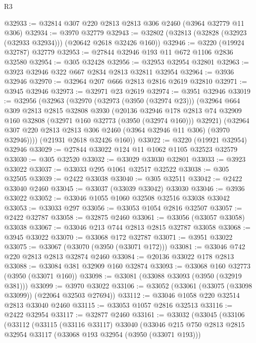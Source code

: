 \begin{lexlean}{R3}
\begin{coremodule}
@32933 := @32814 @307 @220 @2813 @2813 @306 @2460 (@3964 @32779 @11 @306)
@32934 := @3970 @32779
@32943 := @32802 (@32813 (@32828 (@32923 (@32933 @32934))) (@20642 @2618 @32426 @160))
@32946 := @3220 (@19924 @32787) @32779
@32953 := @27844 @32946 @193 @11 @672 @1106 @2836 @32580
@32954 := @305 @32428
@32956 := @32953 @32954 @32801
@32963 := @3923 @32946 @322 @667 @2834 @2813 @32811 @32954
@32964 := @3936 @32946
@32970 := @32964 @207 @666 @2813 @2816 @2619 @32810
@32971 := @3945 @32946
@32973 := @32971 @23 @2619
@32974 := @3951 @32946
@33019 := @32956
    (@32963
      (@32970
        (@32973 (@3950 (@32974 @23)))
        (@32964
          @664
          @309
          @2813
          @2815
          @32808
          @3930
          (@20136
            @32946
            @178
            @2813
            @74
            @32909
            @160
            @32808
            (@32971 @160 @32773 (@3950 (@32974 @160)))
            @32921)
          (@32964 @307 @220 @2813 @2813 @306 @2460 (@3964 @32946 @11 @306) (@3970 @32946))))
      (@21931 @2618 @32426 @160))
@33022 := @3220 (@19921 @32954) @32946
@33029 := @27844 @33022 @124 @11 @1062 @1105 @32523 @32579
@33030 := @305 @32520
@33032 := @33029 @33030 @32801
@33033 := @3923 @33022
@33037 := @33033 @295 @1061 @32517 @32522
@33038 := @305 @32505
@33039 := @2422 @33038
@33040 := @305 @32511
@33042 := @2422 @33040 @2460
@33045 := @33037 (@33039 @33042) @33030
@33046 := @3936 @33022
@33052 := @33046 @1055 @1060 @32508 @32516 @33038 @33042
@33053 := @33033 @297
@33056 := @33053 @1054 @2816 @32507
@33057 := @2422 @32787
@33058 := @32875 @2460
@33061 := @33056 (@33057 @33058) @33038
@33067 := @33046 @213 @744 @2813 @2815 @32787 @33058
@33068 := @3945 @33022
@33070 := @33068 @172 @32787
@33071 := @3951 @33022
@33075 := @33067 (@33070 (@3950 (@33071 @172)))
@33081 := @33046 @742 @220 @2813 @2813 @32874 @2460
@33084 := @20136 @33022 @178 @2813
@33088 := @33084 @381 @32909 @160 @32874
@33093 := @33068 @160 @32773 (@3950 (@33071 @160))
@33098 := @33081 (@33088 @33093 (@3950 (@32919 @381)))
@33099 := @3970 @33022
@33106 := @33052 (@33061 (@33075 (@33098 @33099)) (@22064 @32503 @27694))
@33112 := @33046 @1058 @220 @32514 @2813 @33040 @2460
@33115 := @33053 @1057 @2816 @32513
@33116 := @2422 @32954
@33117 := @32877 @2460
@33161 := @33032
    (@33045
      (@33106
        (@33112
          (@33115
            (@33116 @33117)
            @33040
            (@33046
              @215
              @750
              @2813
              @2815
              @32954
              @33117
              (@33068 @193 @32954 (@3950 (@33071 @193)))

\end{coremodule}
\end{lexlean}
